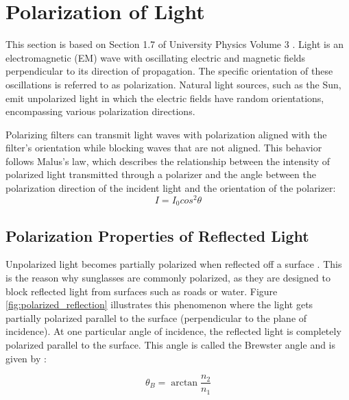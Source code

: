 \section{Polarization of Light}
This section is based on Section 1.7 of University Physics Volume 3 \cite[30-33]{lingUniversityPhysicsVolume2016}.
Light is an electromagnetic (EM) wave with oscillating electric and magnetic fields perpendicular to its direction of propagation.
The specific orientation of these oscillations is referred to as polarization.
Natural light sources, such as the Sun, emit unpolarized light in which the electric fields have random orientations, encompassing various polarization directions.

Polarizing filters can transmit light waves with polarization aligned with the filter's orientation while blocking waves that are not aligned.
This behavior follows Malus's law, which describes the relationship between the intensity of polarized light transmitted through a polarizer and the angle between the polarization direction of the incident light and the orientation of the polarizer:
\begin{equation}
    I = I_0 cos^2 \theta
\end{equation}

\subsection{Polarization Properties of Reflected Light}
Unpolarized light becomes partially polarized when reflected off a surface \cite[34]{lingUniversityPhysicsVolume2016}.
This is the reason why sunglasses are commonly polarized, as they are designed to block reflected light from surfaces such as roads or water.
Figure \ref{fig:polarized_reflection} illustrates this phenomenon where the light gets partially polarized parallel to the surface (perpendicular to the plane of incidence).
At one particular angle of incidence, the reflected light is completely polarized parallel to the surface.
This angle is called the Brewster angle and is given by \cite{BrewsterAngle2023}:

\begin{equation}
    \theta_B = \arctan{\frac{n_2}{n_1}}
\end{equation}

